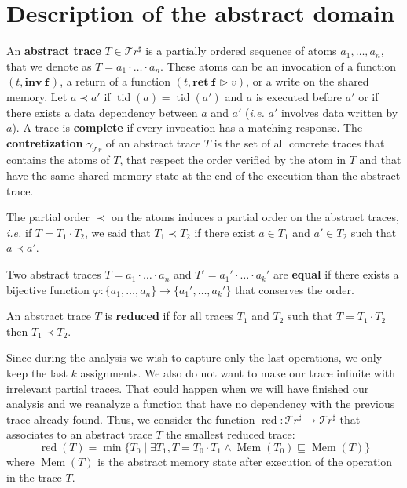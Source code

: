 \documentclass[runningheads]{llncs}
\newcommand{\inv}[1]{\mathbf{inv}\ \mathtt{#1}}
\newcommand{\ret}[2]{\mathbf{ret}\ \mathtt{#1} \vartriangleright #2}
\newcommand{\Traces}{\mathcal T\!r}
\newcommand{\aTraces}{\mathcal T\!r^\sharp}
\DeclareMathOperator{\tid}{tid}
\DeclareMathOperator{\red}{red}
\DeclareMathOperator{\Mem}{Mem}
\begin{document}
\section{Description of the abstract domain}
\label{sec:absDom}

\begin{definition}
	An \textbf{abstract trace} $T \in \aTraces$ is a partially ordered sequence of atoms $a_1, \dots, a_n$, that we denote as $T = a_1 \cdot \ldots \cdot a_n$. These atoms can be an invocation of a function $(t, \inv{f})$, a return of a function $(t, \ret{f}{v})$, or a write on the shared memory. Let $a \prec a'$ if $\tid(a) = \tid(a')$ and $a$ is executed before $a'$ or if there exists a data dependency between $a$ and $a'$ (\emph{i.e.} $a'$ involves data written by $a$). A trace is \textbf{complete} if every invocation has a matching response. The \textbf{contretization} $\gamma_{\Traces}$ of an abstract trace $T$ is the set of all concrete traces that contains the atoms of $T$, that respect the order verified by the atom in $T$ and that have the same shared memory state at the end of the execution than the abstract trace.
\end{definition}

The partial order $\prec$ on the atoms induces a partial order on the abstract traces, \textit{i.e.} if $T = T_1 \cdot T_2$, we said that $T_1 \prec T_2$ if there exist $a\in T_1$ and $a' \in T_2$ such that $a\prec a'$. 


\begin{definition}
		Two abstract traces $T = a_1 \cdot \ldots \cdot a_n$ and $T' = a_1' \cdot \ldots \cdot a_k'$ are \textbf{equal} if there exists a bijective function $\varphi : \{a_1,\dots,a_n\} \rightarrow \{a_1',\dots, a_k'\}$ that conserves the order. 
\end{definition}

\begin{definition}
	An abstract trace $T$ is \textbf{reduced} if for all traces $T_1$ and $T_2$ such that $T=T_1\cdot T_2$ then $T_1 \prec T_2$. 
\end{definition}



Since during the analysis we wish to capture only the last operations, we only keep the last $k$ assignments. We also do not want to make our trace infinite with irrelevant partial traces. That could happen when we will have finished our analysis and we reanalyze a function that have no dependency with the previous trace already found. Thus, we consider the function $\red : \aTraces \rightarrow \aTraces$ that associates to an abstract trace $T$ the smallest reduced trace:
\begin{equation} \label{eq:red}
	\red(T) = \min \{T_0 \mid \exists T_1, T = T_0 \cdot T_1 \wedge \Mem(T_0) \sqsubseteq \Mem(T)\}
\end{equation}%
where $\Mem(T)$ is the abstract memory state after execution of the operation in the trace $T$. 
\end{document}
